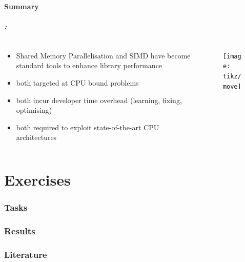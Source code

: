 \documentclass[9pt,xcolor=table]{beamer}
\begin{document}
\subsection{Summary}
\begin{frame}
\frametitle{\insertsectionhead{}: \insertsubsectionhead{}}

\begin{columns}
  \begin{column}{.62\textwidth}
    \begin{itemize}[<+->]\large
    \item Shared Memory Parallelisation and SIMD have become standard
      tools to enhance library performance
    \item both targeted at CPU bound problems
    \item both incur developer time overhead (learning, fixing,
      optimising)
    \item both required to exploit state-of-the-art CPU architectures
    \end{itemize}
  \end{column}
  \begin{column}{.35\textwidth}
    \begin{figure}[htb]
      \texttt{[image: tikz/move]}
    \end{figure}
  \end{column}

\end{columns}
\end{frame}

\part{Exercises}
\frame{\partpage}
\section{Tasks}
\section{Results}

\section{Literature}
\begin{frame}[c]
\frametitle{\insertsection{}}
\nocite{*}
\tiny%


\end{frame}
\end{document}
